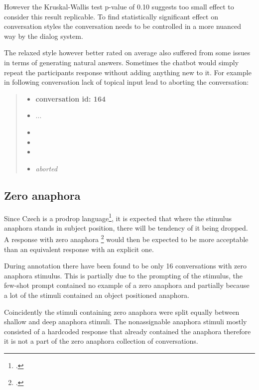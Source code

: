 However the Kruskal-Wallis test p-value of 0.10 suggests too small effect
to consider this result replicable.
To find statistically significant effect on conversation styles
the conversation needs to be controlled in a more nuanced way by the dialog system.

The relaxed style however better rated on average also suffered from some issues
in terms of generating natural answers.
Sometimes the chatbot would simply repeat the participants response without adding anything new to it.
For example in following conversation lack of topical input lead to aborting the conversation:

\begin{quote}
\begin{itemize}[label={}, leftmargin=0pt, itemsep=0.5em]
\item \textbf{conversation id: 164}
\item ...
\item {}
\item {}
\item {}
\item \textit{aborted}
\end{itemize}
\end{quote}


\subsection{Zero anaphora}

Since Czech is a prodrop language\footcite{pevskova2019slavic},
it is expected that where the stimulus anaphora stands in subject position,
there will be tendency of it being dropped.
A response with zero anaphora \footcite{zero} would then be expected to be more acceptable
than an equivalent response with an explicit one.

During annotation there have been found to be only 16 conversations with zero anaphora stimulus.
This is partially due to the prompting of the stimulus,
the few-shot prompt contained no example of a zero anaphora and
partially because a lot of the stimuli contained an object positioned anaphora.

Coincidently the stimuli containing zero anaphora were split equally between shallow and deep anaphora stimuli.
The nonassignable anaphora stimuli mostly consisted of a hardcoded response that already contained the anaphora
therefore it is not a part of the zero anaphora collection of conversations.

